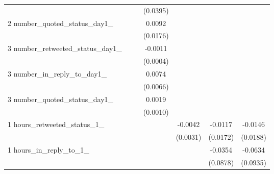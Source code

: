 {\begin{tabular}{l*{6}{c}}
                    &                     &                     &    (0.0395)         &                     &                     &                     \\
2 number\_quoted\_status\_day1\_&                     &                     &      0.0092         &                     &                     &                     \\
                    &                     &                     &    (0.0176)         &                     &                     &                     \\
3 number\_retweeted\_status\_day1\_&                     &                     &     -0.0011\sym{***}&                     &                     &                     \\
                    &                     &                     &    (0.0004)         &                     &                     &                     \\
3 number\_in\_reply\_to\_day1\_&                     &                     &      0.0074         &                     &                     &                     \\
                    &                     &                     &    (0.0066)         &                     &                     &                     \\
3 number\_quoted\_status\_day1\_&                     &                     &      0.0019\sym{*}  &                     &                     &                     \\
                    &                     &                     &    (0.0010)         &                     &                     &                     \\
1 hours\_retweeted\_status\_1\_&                     &                     &                     &     -0.0042         &     -0.0117         &     -0.0146         \\
                    &                     &                     &                     &    (0.0031)         &    (0.0172)         &    (0.0188)         \\
1 hours\_in\_reply\_to\_1\_&                     &                     &                     &                     &     -0.0354         &     -0.0634         \\
                    &                     &                     &                     &                     &    (0.0878)         &    (0.0935)         \\

\end{tabular}}
